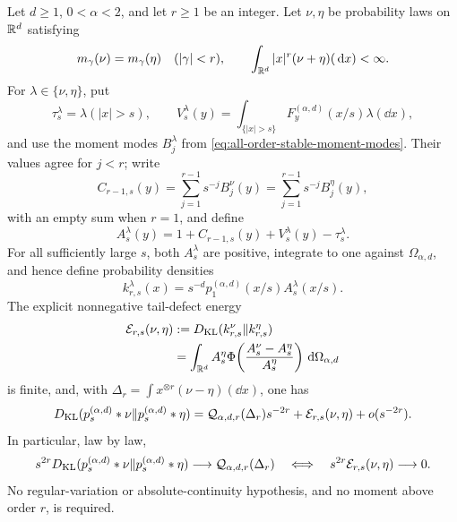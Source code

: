 \begin{corollary}
\label{thm:stable-arbitrary-order-law-by-law-decomposition}
Let \(d\ge1\), \(0<\alpha<2\), and let \(r\ge1\) be an integer.  Let
\(\nu,\eta\) be probability laws on \(\mathbb{R}^d\) satisfying
\begin{equation}\label{eq:arbitrary-tail-moment-hypotheses}
 m_\gamma(\nu)=m_\gamma(\eta)\quad(|\gamma|<r),
 \qquad
 \int_{\mathbb{R}^d}|x|^r(\nu+\eta)(\,\mathrm{d} x)<\infty.
\end{equation}
For \(\lambda\in\{\nu,\eta\}\), put
\[
 \tau_s^\lambda=\lambda(|x|>s),\qquad
 V_s^\lambda(y)=\int_{\{|x|>s\}}
 F_y^{(\alpha,d)}(x/s)\lambda(\dd x),
\]
and use the moment modes \(B_j^\lambda\) from
\eqref{eq:all-order-stable-moment-modes}.  Their values agree for \(j<r\);
write
\[
 C_{r-1,s}(y)=\sum_{j=1}^{r-1}s^{-j}B_j^\nu(y)
             =\sum_{j=1}^{r-1}s^{-j}B_j^\eta(y),
\]
with an empty sum when \(r=1\), and define
\begin{equation}\label{eq:arbitrary-tail-proxy-quotients}
 A_s^\lambda(y)=1+C_{r-1,s}(y)+V_s^\lambda(y)-\tau_s^\lambda.
\end{equation}
For all sufficiently large \(s\), both \(A_s^\lambda\) are positive,
integrate to one against \(\Omega_{\alpha,d}\), and hence define probability
densities
\[
 k_{r,s}^\lambda(x)=s^{-d}p_1^{(\alpha,d)}(x/s)
                    A_s^\lambda(x/s).
\]
 The explicit nonnegative tail-defect energy
\begin{align}
 \mathcal E_{r,s}(\nu,\eta)
 &:=D_{\rm KL}(k_{r,s}^\nu\|k_{r,s}^\eta)\notag\\
 &=\int_{\mathbb{R}^d}A_s^\eta
 \Phi\!\left(\frac{A_s^\nu-A_s^\eta}{A_s^\eta}\right)
 \,\mathrm{d}\Omega_{\alpha,d}
 \label{eq:arbitrary-tail-defect-energy}
\end{align}
is finite, and, with
\(\Delta_r=\int x^{\otimes r}(\nu-\eta)(\dd x)\), one has
\begin{equation}\label{eq:arbitrary-tail-defect-decomposition}
 D_{\rm KL}(p_s^{(\alpha,d)}*\nu\|p_s^{(\alpha,d)}*\eta)
 =\mathcal Q_{\alpha,d,r}(\Delta_r)s^{-2r}
  +\mathcal E_{r,s}(\nu,\eta)+o(s^{-2r}).
\end{equation}
In particular, law by law,
\begin{equation}\label{eq:arbitrary-tail-defect-criterion}
 s^{2r}D_{\rm KL}(p_s^{(\alpha,d)}*\nu\|p_s^{(\alpha,d)}*\eta)
 \longrightarrow\mathcal Q_{\alpha,d,r}(\Delta_r)
 \quad\Longleftrightarrow\quad
 s^{2r}\mathcal E_{r,s}(\nu,\eta)\longrightarrow0.
\end{equation}
No regular-variation or absolute-continuity hypothesis, and no moment above
order \(r\), is required.
\end{corollary}

